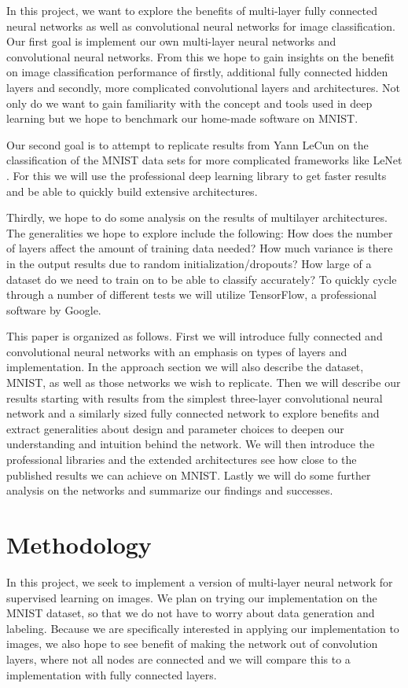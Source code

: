 \documentclass[12pt, twocolumn]{article}
\begin{document}
In this project, we want to explore the benefits of multi-layer fully connected neural networks as well as convolutional neural networks for image classification. Our first goal is implement our own multi-layer neural networks and convolutional neural networks. From this we hope to gain insights on the benefit on image classification performance of firstly, additional fully connected hidden layers and secondly, more complicated convolutional layers and architectures.  Not only do we want to gain familiarity with the concept and tools used in deep learning but we hope to benchmark our home-made software on MNIST. 

Our second goal is to attempt to replicate results from Yann LeCun on the classification of the MNIST data sets for more complicated frameworks like LeNet \cite{LeCun1998}. For this we will use the professional deep learning library to get faster results and be able to quickly build extensive architectures. 

Thirdly, we hope to do some analysis on the results of multilayer architectures. The generalities we hope to explore include the following: How does the number of layers affect the amount of training data needed?  How much variance is there in the output results due to random initialization/dropouts? How large of a dataset do we need to train on to be able to classify accurately?  To quickly cycle through a number of different tests we will utilize TensorFlow, a professional software by Google.

This paper is organized as follows. First we will introduce fully connected and convolutional neural networks with an emphasis on types of layers and implementation. In the approach section we will also describe the dataset, MNIST, as well as those networks we wish to replicate.  Then we will describe our results starting with  results from the simplest three-layer convolutional neural network and a similarly sized fully connected network to explore benefits and extract generalities about design and parameter choices to deepen our understanding and intuition behind the network. We will then introduce the professional libraries and the extended architectures see how close to the published results we can achieve on MNIST. Lastly we will do some further analysis on the networks and summarize our findings and successes.

\section{Methodology}
In this project, we seek to implement a version of multi-layer neural network for supervised learning on images. We plan on trying our implementation on the MNIST dataset, so that we do not have to worry about data generation and labeling. Because we are specifically interested in applying our implementation to images, we also hope to see benefit of making the network out of convolution layers, where not all nodes are connected and we will compare this to a implementation with fully connected layers.
\end{document}

